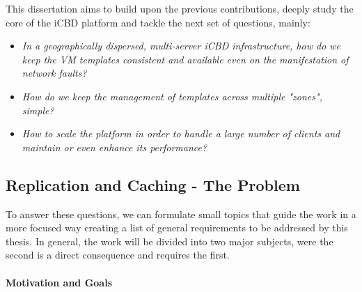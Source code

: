 This dissertation aims to build upon the previous contributions, deeply study the core of the iCBD platform and tackle the next set of questions, mainly:

\begin{itemize}
	\item \textit{In a geographically dispersed, multi-server iCBD infrastructure, how do we keep the VM templates consistent and available even on the manifestation of network faults?}
	\item \textit{How do we keep the management of templates across multiple "zones", simple?}
	\item \textit{How to scale the platform in order to handle a large number of clients and maintain or even enhance its performance?}
\end{itemize}




\subsection{Replication and Caching - The Problem}
\label{sec:intro_replication_cache_theproblem}

To answer these questions, we can formulate small topics that guide the work in a more focused way creating a list of general requirements to be addressed by this thesis.
In general, the work will be divided into two major subjects, were the second is a direct consequence and requires the first.


\paragraph{Motivation and Goals}
\label{par:intro_motivation_goals}

